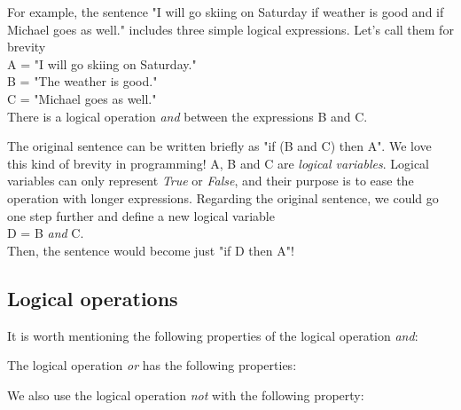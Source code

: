 \documentclass[article,A4,12pt]{llncs}
\begin{document}
{{{{For example, the sentence "I will go skiing on Saturday if weather is good and if 
Michael goes as well." includes three simple logical expressions. Let's call 
them for brevity\\

\noindent
A = "I will go skiing on Saturday."\\
B = "The weather is good."\\
C = "Michael goes as well."\\

\noindent
There is a logical operation {\em and} between the expressions B and C.

The original sentence can be written briefly as "if (B and C) then A". We love this kind of 
brevity in programming! A, B and C are {\em logical variables}. Logical variables 
can only represent {\em True} or {\em False}, and their purpose is to ease the operation with 
longer expressions.
Regarding the original sentence, we could go one step further and define a new logical variable\\

\noindent
D = B {\em and} C.\\

\noindent
Then, the sentence would become just "if D then A"! 

\subsection{Logical operations}

It is worth mentioning the following properties of the logical operation {\em and}:\\

\begin{center}
\end{center}
\vspace{4mm}
\noindent
The logical operation {\em or} has the following properties:\\

\begin{center}
\end{center}
\vspace{4mm}
\noindent
We also use the logical operation {\em not} with the following property:\\

}}}}
\end{document}

